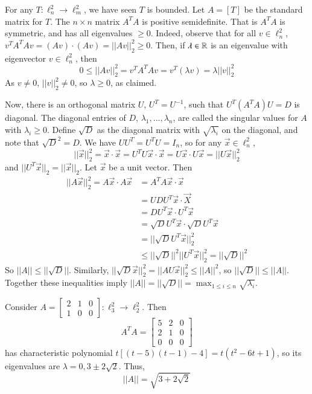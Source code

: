 \begin{eg}
    For any $T:\ell_n^2\rightarrow \ell_m^2$, we have seen $T$ is bounded. Let $A = [T]$ be the standard matrix for $T$. The $n\times n$ matrix $A^TA$ is positive semidefinite. That is $A^TA$ is symmetric, and has all eigenvalues $\geq 0$. Indeed, observe that for all $v \in \ell_n^2$, $v^TA^TAv = (Av)\cdot(Av) = ||Av||_2^2\geq 0$. Then, if $\lambda \in \mathbb R$ is an eigenvalue with eigenvector $v \in \ell_n^2$, then $$0 \leq ||Av||_2^2 = v^TA^TAv = v^T(\lambda v) = \lambda||v||_2^2$$ As $v\neq 0$, $||v||_2^2 \neq 0$, so $\lambda \geq 0$, as claimed. 

    Now, there is an orthogonal matrix $U$, $U^T = U^{-1}$, such that $U^T(A^TA)U = D$ is diagonal. The diagonal entries of $D$, $\lambda_1,...,\lambda_n$, are called the singular values for $A$ with $\lambda_i \geq 0$. Define $\sqrt{D}$ as the diagonal matrix with $\sqrt{\lambda_i}$ on the diagonal, and note that $\sqrt{D}^2 = D$. We have $UU^T = U^TU = I_n$, so for any $\vec{x} \in \ell_n^2$, $$||\vec{x}||_2^2 = \vec{x}\cdot\vec{x} = U^TU\vec{x}\cdot\vec{x} = U\vec{x}\cdot U\vec{x} = ||U\vec{x}||_2^2$$ and $||U^T\vec{x}||_2 = ||\vec{x}||_2$. Let $\vec{x}$ be a unit vector. Then \begin{align*}
        ||A\vec{x}||_2^2 = A\vec{x}\cdot A\vec{x} &= A^TA\vec{x}\cdot\vec{x} \\
        &= UDU^T\vec{x}\cdot \vec{X} \\
        &= DU^T\vec{x}\cdot U^T\vec{x} \\
        &= \sqrt{D}U^T\vec{x}\cdot\sqrt{D}U^T\vec{x} \\
        &= ||\sqrt{D}U^T\vec{x}||_2^2 \\
        &\leq ||\sqrt{D}||^2||U^T\vec{x}||_2^2 = ||\sqrt{D}||^2
    \end{align*}
    So $||A|| \leq ||\sqrt{D}||$. Similarly, $||\sqrt{D}\vec{x}||_2^2 = ||AU\vec{x}||_2^2\leq ||A||^2$, so $||\sqrt{D}||\leq ||A||$. Together these inequalities imply $||A|| = ||\sqrt{D}|| = \max_{1\leq i \leq n}\sqrt{\lambda_i}$.
\end{eg}

\begin{eg}
    Consider $A = \begin{bmatrix} 2 & 1 & 0 \\ 1 & 0 & 0\end{bmatrix}:\ell_3^2\rightarrow \ell_2^2$. Then $$A^TA = \begin{bmatrix} 5 & 2 & 0 \\ 2 & 1 & 0\\ 0 & 0 & 0 \end{bmatrix}$$ has characteristic polynomial $t[(t-5)(t-1)-4] = t(t^2-6t+1)$, so its eigenvalues are $\lambda = 0,3\pm 2\sqrt{2}$. Thus, $$||A|| = \sqrt{3+2\sqrt{2}}$$
\end{eg}

